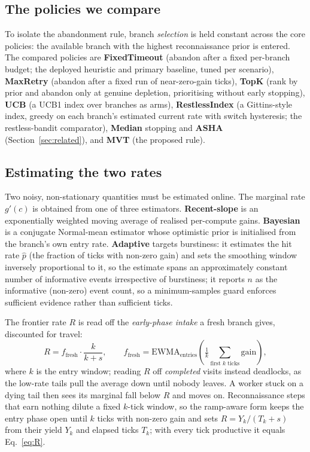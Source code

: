 \documentclass[runningheads]{llncs}
\newcommand{\gprime}{g'(c)}
\newcommand{\RR}{R}
\begin{document}
\subsection{The policies we compare}
To isolate the abandonment rule, branch \emph{selection} is held constant across the core
policies: the available branch with the highest reconnaissance prior is entered. The
compared policies are \textbf{FixedTimeout} (abandon after a fixed per-branch budget; the
deployed heuristic and primary baseline, tuned per scenario), \textbf{MaxRetry} (abandon
after a fixed run of near-zero-gain ticks), \textbf{TopK} (rank by prior and abandon only
at genuine depletion, prioritising without early stopping), \textbf{UCB} (a UCB1 index
over branches as arms), \textbf{RestlessIndex} (a Gittins-style index, greedy on each
branch's estimated current rate with switch hysteresis; the restless-bandit comparator),
\textbf{Median} stopping and \textbf{ASHA} (Section~\ref{sec:related}), and \textbf{MVT}
(the proposed rule).

\subsection{Estimating the two rates}
Two noisy, non-stationary quantities must be estimated online. The marginal rate
$\gprime$ is obtained from one of three estimators. \textbf{Recent-slope} is an
exponentially weighted moving average of realised per-compute gains. \textbf{Bayesian}
is a conjugate Normal-mean estimator whose optimistic prior is initialised from the
branch's own entry rate. \textbf{Adaptive} targets burstiness: it estimates the hit rate $\hat{p}$ (the
fraction of ticks with non-zero gain) and sets the smoothing window inversely
proportional to it, so the estimate spans an approximately constant number of informative
events irrespective of burstiness; it reports $n$ as the informative (non-zero) event
count, so a minimum-samples guard enforces sufficient evidence rather than sufficient
ticks.

The frontier rate $\RR$ is read off the \emph{early-phase intake} a fresh branch
gives, discounted for travel:
\begin{equation}
\RR = f_{\text{fresh}} \cdot \frac{k}{k + s},
\qquad
f_{\text{fresh}} = \mathrm{EWMA}_{\text{entries}}\!\left(\tfrac{1}{k}\textstyle\sum_{\text{first } k \text{ ticks}} \text{gain}\right),
\label{eq:R}
\end{equation}
where $k$ is the entry window; reading $\RR$ off \emph{completed} visits instead deadlocks,
as the low-rate tails pull the average down until nobody leaves. A worker stuck on
a dying tail then sees its marginal fall below $\RR$ and moves on. Reconnaissance steps that earn nothing dilute
a fixed $k$-tick window, so the ramp-aware form keeps the entry phase open until $k$ ticks
with non-zero gain and sets $\RR = Y_k/(T_k+s)$ from their yield $Y_k$ and elapsed ticks
$T_k$; with every tick productive it equals Eq.~\eqref{eq:R}.
\end{document}
